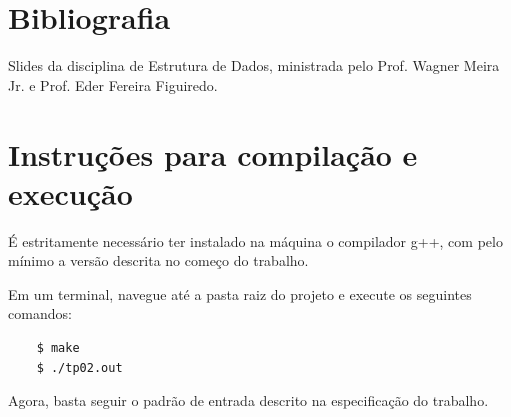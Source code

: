 \documentclass{article}
\begin{document}
\section*{Bibliografia}

Slides da disciplina de Estrutura de Dados, ministrada pelo Prof. Wagner Meira Jr. e Prof. Eder Fereira Figuiredo.


\section*{Instruções para compilação e execução}

É estritamente necessário ter instalado na máquina o compilador g++, com pelo mínimo a versão descrita no começo do trabalho.  

Em um terminal, navegue até a pasta raiz do projeto e execute os seguintes comandos:

\begin{verbatim}
    $ make
    $ ./tp02.out

\end{verbatim}

Agora, basta seguir o padrão de entrada descrito na especificação do trabalho.
\end{document}
